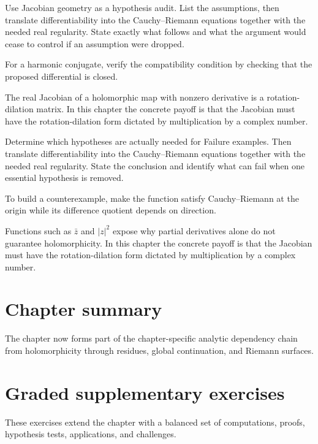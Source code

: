 \begin{exercise}\label{exr:iv02-07}
Use Jacobian geometry as a hypothesis audit. List the assumptions, then translate differentiability into the Cauchy--Riemann equations together with the needed real regularity. State exactly what follows and what the argument would cease to control if an assumption were dropped.
\end{exercise}
\begin{hint}
For a harmonic conjugate, verify the compatibility condition by checking that the proposed differential is closed.
\end{hint}
\begin{solution}
The real Jacobian of a holomorphic map with nonzero derivative is a rotation-dilation matrix. In this chapter the concrete payoff is that the Jacobian must have the rotation-dilation form dictated by multiplication by a complex number.
\end{solution}

\begin{exercise}\label{exr:iv02-08}
Determine which hypotheses are actually needed for Failure examples. Then translate differentiability into the Cauchy--Riemann equations together with the needed real regularity. State the conclusion and identify what can fail when one essential hypothesis is removed.
\end{exercise}
\begin{hint}
To build a counterexample, make the function satisfy Cauchy--Riemann at the origin while its difference quotient depends on direction.
\end{hint}
\begin{solution}
Functions such as $\bar z$ and $|z|^2$ expose why partial derivatives alone do not guarantee holomorphicity. In this chapter the concrete payoff is that the Jacobian must have the rotation-dilation form dictated by multiplication by a complex number.
\end{solution}

\section*{Chapter summary}
The chapter now forms part of the chapter-specific analytic dependency chain from holomorphicity through residues, global continuation, and Riemann surfaces.
\section{Graded supplementary exercises}
These exercises extend the chapter with a balanced set of computations, proofs, hypothesis tests, applications, and challenges.

